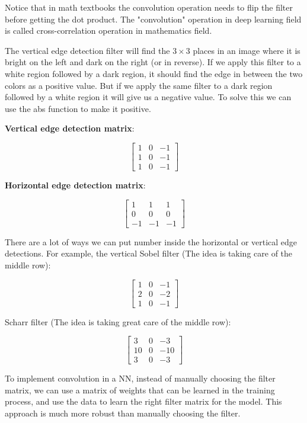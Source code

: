 \documentclass{article}
\begin{document}
\noindent Notice that in math textbooks the convolution operation needs to flip the filter before getting the dot product. The "convolution" operation in deep learning field is called cross-correlation operation in mathematics field.

\bigskip

\noindent The vertical edge detection filter will find the \(3 \times 3\) places in an image where it is bright on the left and dark on the right (or in reverse). If we apply this filter to a white region followed by a dark region, it should find the edge in between the two colors as a positive value. But if we apply the same filter to a dark region followed by a white region it will give us a negative value. To solve this we can use the abs function to make it positive.

\bigskip

\noindent \textbf{Vertical edge detection matrix}:

\[
\begin{bmatrix}
1 & 0 & -1\\
1 & 0 & -1\\
1 & 0 & -1
\end{bmatrix}
\]

\noindent \textbf{Horizontal edge detection matrix}:

\[
\begin{bmatrix}
1 & 1 & 1\\
0 & 0 & 0\\
-1 & -1 & -1
\end{bmatrix}
\]

\noindent There are a lot of ways we can put number inside the horizontal or vertical edge detections. For example, the vertical Sobel filter (The idea is taking care of the middle row):

\[
\begin{bmatrix}
1 & 0 & -1\\
2 & 0 & -2\\
1 & 0 & -1
\end{bmatrix}
\]

\noindent Scharr filter (The idea is taking great care of the middle row):

\[
\begin{bmatrix}
3 & 0 & -3\\
10 & 0 & -10\\
3 & 0 & -3
\end{bmatrix}
\]

\noindent To implement convolution in a NN, instead of manually choosing the filter matrix, we can use a matrix of weights that can be learned in the training process, and use the data to learn the right filter matrix for the model. This approach is much more robust than manually choosing the filter.
\end{document}
